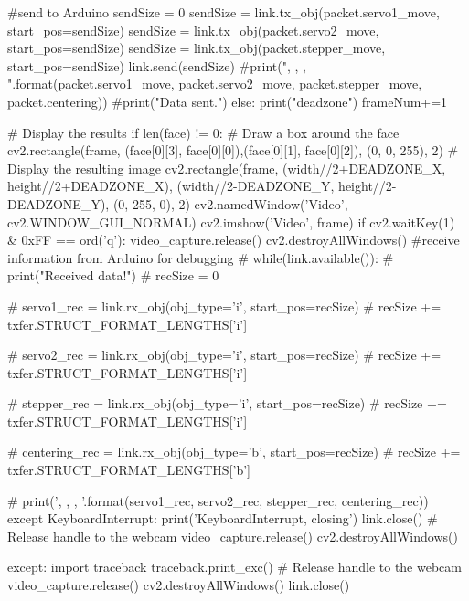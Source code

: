 \begin{python}
                    #send to Arduino
                    sendSize = 0
                    sendSize = link.tx_obj(packet.servo1_move, start_pos=sendSize)
                    sendSize = link.tx_obj(packet.servo2_move, start_pos=sendSize)
                    sendSize = link.tx_obj(packet.stepper_move, start_pos=sendSize)
                    link.send(sendSize)
                    #print("{}, {}, {}, {}".format(packet.servo1_move, packet.servo2_move, packet.stepper_move, packet.centering))
                    #print("Data sent.\n")
                else:
                    print("deadzone")
        frameNum+=1

        # Display the results
        if len(face) != 0:
            # Draw a box around the face
            cv2.rectangle(frame, (face[0][3], face[0][0]),(face[0][1], face[0][2]), (0, 0, 255), 2)
        # Display the resulting image
        cv2.rectangle(frame, (width//2+DEADZONE_X, height//2+DEADZONE_X), (width//2-DEADZONE_Y, height//2-DEADZONE_Y), (0, 255, 0), 2)
        cv2.namedWindow('Video', cv2.WINDOW_GUI_NORMAL)
        cv2.imshow('Video', frame)
        if cv2.waitKey(1) & 0xFF == ord('q'):
            video_capture.release()
            cv2.destroyAllWindows()
        #receive information from Arduino for debugging
        # while(link.available()):
        #     print("Received data!")
        #     recSize = 0

        #     servo1_rec = link.rx_obj(obj_type='i', start_pos=recSize)
        #     recSize += txfer.STRUCT_FORMAT_LENGTHS['i']

        #     servo2_rec = link.rx_obj(obj_type='i', start_pos=recSize)
        #     recSize += txfer.STRUCT_FORMAT_LENGTHS['i']

        #     stepper_rec = link.rx_obj(obj_type='i', start_pos=recSize)
        #     recSize += txfer.STRUCT_FORMAT_LENGTHS['i']

        #     centering_rec = link.rx_obj(obj_type='b', start_pos=recSize)
        #     recSize += txfer.STRUCT_FORMAT_LENGTHS['b']

        #     print('{}, {}, {}, {}'.format(servo1_rec, servo2_rec, stepper_rec, centering_rec))
except KeyboardInterrupt:
    print('KeyboardInterrupt, closing')
    link.close()
    # Release handle to the webcam
    video_capture.release()
    cv2.destroyAllWindows()

except:
    import traceback
    traceback.print_exc()
    # Release handle to the webcam
    video_capture.release()
    cv2.destroyAllWindows()
    link.close()
\end{python}